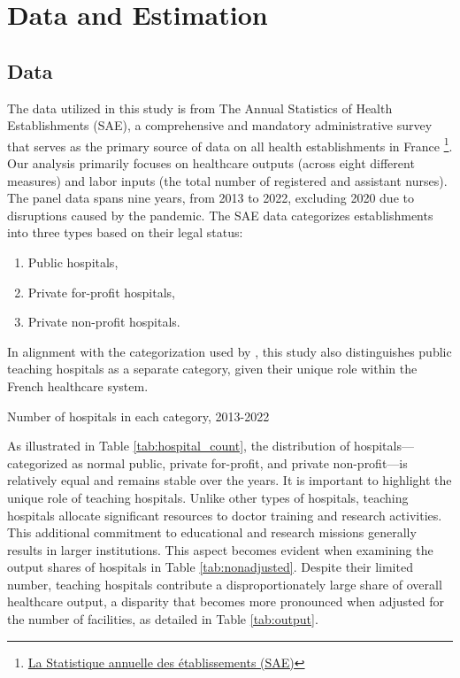 \documentclass[12pt]{article}
\begin{document}
\section{Data and Estimation}
\subsection{Data}

The data utilized in this study is from The Annual Statistics of Health
Establishments (SAE), a comprehensive and mandatory administrative survey that
serves as the primary source of data on all health establishments in France
\footnote{\href{https://data.drees.solidarites-sante.gouv.fr/explore/dataset/708_bases-statistiques-sae/information/}{La
        Statistique annuelle des établissements (SAE)}}. Our analysis primarily focuses
on healthcare outputs (across eight different measures) and labor inputs (the
total number of registered and assistant nurses). The panel data spans nine
years, from 2013 to 2022, excluding 2020 due to disruptions caused by the
pandemic. The SAE data categorizes establishments into three types based on
their legal status:

\begin{enumerate}
    \item Public hospitals,
    \item Private for-profit hospitals,
    \item Private non-profit hospitals.
\end{enumerate}

In alignment with the categorization used by \citet{croiset2024hospitals}, this
study also distinguishes public teaching hospitals as a separate category,
given their unique role within the French healthcare system.

\begin{table}[h!]\fontsize{10pt}{12pt}\selectfont
    \begin{adjustbox}{width=\textwidth,center}
        \centering
        
    \end{adjustbox}
    \caption{Number of hospitals in each category, 2013-2022}
    \label{tab:hospital_count}
\end{table}

As illustrated in Table \ref{tab:hospital_count}, the distribution of
hospitals—categorized as normal public, private for-profit, and private
non-profit—is relatively equal and remains stable over the years. It is
important to highlight the unique role of teaching hospitals. Unlike other
types of hospitals, teaching hospitals allocate significant resources to doctor
training and research activities. This additional commitment to educational and
research missions generally results in larger institutions. This aspect becomes
evident when examining the output shares of hospitals in Table
\ref{tab:nonadjusted}. Despite their limited number, teaching hospitals
contribute a disproportionately large share of overall healthcare output, a
disparity that becomes more pronounced when adjusted for the number of
facilities, as detailed in Table \ref{tab:output}.
\end{document}
